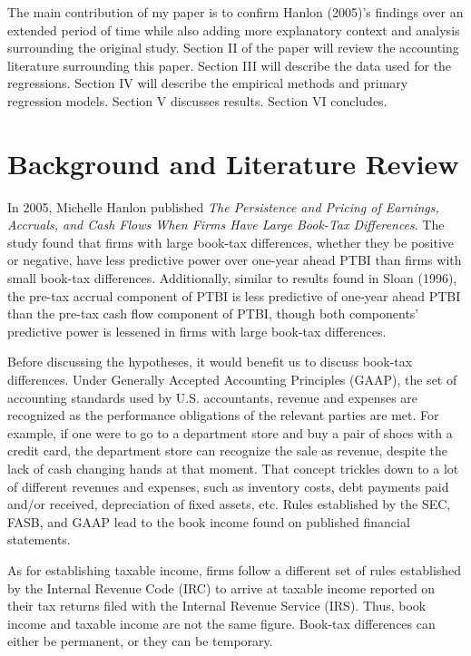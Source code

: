 \documentclass[12pt]{article}
\begin{document}
The main contribution of my paper is to confirm Hanlon (2005)’s findings over an extended period of time while also adding more explanatory context and analysis surrounding the original study. Section II of the paper will review the accounting literature surrounding this paper. Section III will describe the data used for the regressions. Section IV will describe the empirical methods and primary regression models. Section V discusses results. Section VI concludes.

\section{Background and Literature Review}
In 2005, Michelle Hanlon published \textit{The Persistence and Pricing of Earnings, Accruals, and Cash Flows When Firms Have Large Book-Tax Differences}. The study found that firms with large book-tax differences, whether they be positive or negative, have less predictive power over one-year ahead PTBI than firms with small book-tax differences. Additionally, similar to results found in Sloan (1996), the pre-tax accrual component of PTBI is less predictive of one-year ahead PTBI than the pre-tax cash flow component of PTBI, though both components’ predictive power is lessened in firms with large book-tax differences.

Before discussing the hypotheses, it would benefit us to discuss book-tax differences. Under Generally Accepted Accounting Principles (GAAP), the set of accounting standards used by U.S. accountants, revenue and expenses are recognized as the performance obligations of the relevant parties are met. For example, if one were to go to a department store and buy a pair of shoes with a credit card, the department store can recognize the sale as revenue, despite the lack of cash changing hands at that moment. That concept trickles down to a lot of different revenues and expenses, such as inventory costs, debt payments paid and/or received, depreciation of fixed assets, etc. Rules established by the SEC, FASB, and GAAP lead to the book income found on published financial statements.

As for establishing taxable income, firms follow a different set of rules established by the Internal Revenue Code (IRC) to arrive at taxable income reported on their tax returns filed with the Internal Revenue Service (IRS). Thus, book income and taxable income are not the same figure. Book-tax differences can either be permanent, or they can be temporary. 
\end{document}
